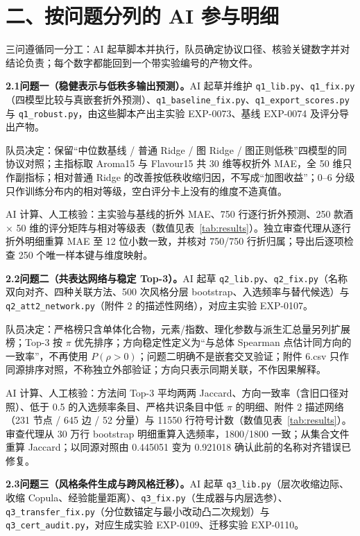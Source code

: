 \documentclass[11pt,a4paper]{article}
\begin{document}
\section*{二、按问题分列的 AI 参与明细}

三问遵循同一分工：AI 起草脚本并执行，队员确定协议口径、核验关键数字并对结论负责；每个数字都能回到一个带实验编号的产物文件。

\textbf{2.1\quad 问题一（稳健表示与低秩多输出预测）。}\quad AI 起草并维护 \texttt{q1\_lib.py}、\texttt{q1\_fix.py}（四模型比较与真嵌套折外预测）、\texttt{q1\_baseline\_fix.py}、\texttt{q1\_export\_scores.py} 与 \texttt{q1\_robust.py}，由这些脚本产出主实验 EXP-0073、基线 EXP-0074 及评分导出产物。

队员决定：保留“中位数基线 / 普通 Ridge / 图 Ridge / 图正则低秩”四模型的同协议对照；主指标取 Aroma15 与 Flavour15 共 30 维等权折外 MAE，全 50 维只作副指标；相对普通 Ridge 的改善按低秩收缩归因，不写成“加图收益”；0--6 分级只作训练分布内的相对等级，空白评分卡上没有的维度不造真值。

AI 计算、人工核验：主实验与基线的折外 MAE、750 行逐行折外预测、250 款酒 × 50 维的评分矩阵与相对等级表（数值见表~\ref{tab:results}）。独立审查代理从逐行折外明细重算 MAE 至 12 位小数一致，并核对 750/750 行折归属；导出后逐项检查 250 个唯一样本键与维度映射。

\textbf{2.2\quad 问题二（共表达网络与稳定 Top-3）。}\quad AI 起草 \texttt{q2\_lib.py}、\texttt{q2\_fix.py}（名称双向对齐、四种关联方法、500 次风格分层 bootstrap、入选频率与替代候选）与 \texttt{q2\_att2\_network.py}（附件 2 的描述性网络），对应主实验 EXP-0107。

队员决定：严格榜只含单体化合物，元素/指数、理化参数与派生汇总量另列扩展榜；Top-3 按 $\pi$ 优先排序；方向稳定性定义为“与总体 Spearman 点估计同方向的一致率”，不再使用 $P(\rho>0)$；问题二明确不是嵌套交叉验证；附件 6.csv 只作同源排序对照，不称独立外部验证；方向只表示同期关联，不作因果解释。

AI 计算、人工核验：方法间 Top-3 平均两两 Jaccard、方向一致率（含旧口径对照）、低于 0.5 的入选频率条目、严格共识条目中低 $\pi$ 的明细、附件 2 描述网络（231 节点 / 645 边 / 52 分量）与 11550 行符号计数（数值见表~\ref{tab:results}）。审查代理从 30 万行 bootstrap 明细重算入选频率，1800/1800 一致；从集合文件重算 Jaccard；以同源对照由 0.445051 变为 0.921018 确认此前的名称对齐错误已修复。

\textbf{2.3\quad 问题三（风格条件生成与跨风格迁移）。}\quad AI 起草 \texttt{q3\_lib.py}（层次收缩边际、收缩 Copula、经验能量距离）、\texttt{q3\_fix.py}（生成器与内层选参）、\texttt{q3\_transfer\_fix.py}（分位数锚定与最小改动凸二次规划）与 \texttt{q3\_cert\_audit.py}，对应生成实验 EXP-0109、迁移实验 EXP-0110。
\end{document}
